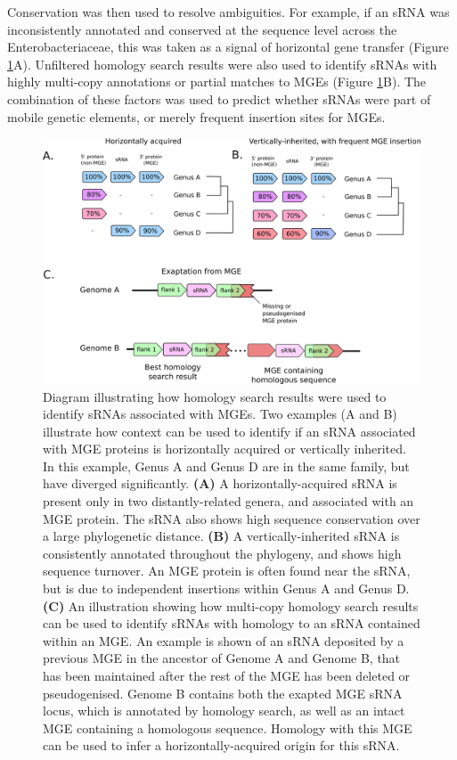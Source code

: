 Conservation was then used to resolve ambiguities. For example, if an sRNA was inconsistently annotated and conserved at the sequence level across the Enterobacteriaceae, this was taken as a signal of horizontal gene transfer (Figure  \ref{fig:hgt_detection}A). Unfiltered homology search results were also used to identify sRNAs with highly multi-copy annotations or partial matches to MGEs (Figure \ref{fig:hgt_detection}B). The combination of these factors was used to predict whether sRNAs were part of mobile genetic elements, or merely frequent insertion sites for MGEs. 
\begin{figure}[H]
    \centering
    \includegraphics[scale=0.9]{sal/hgt_detection.png}
    \caption[Diagram illustrating how homology search results were used to identify sRNAs associated with MGEs]{Diagram illustrating how homology search results were used to identify sRNAs associated with MGEs. Two examples (A and B) illustrate how context can be used to identify if an sRNA associated with MGE proteins is horizontally acquired or vertically inherited. In this example, Genus A and Genus D are in the same family, but have diverged significantly. \textbf{(A)} A horizontally-acquired sRNA is present only in two distantly-related genera, and associated with an MGE protein. The sRNA also shows high sequence conservation over a large phylogenetic distance. \textbf{(B)} A vertically-inherited sRNA is consistently annotated throughout the phylogeny, and shows high sequence turnover. An MGE protein is often found near the sRNA, but is due to independent insertions within Genus A and Genus D. \textbf{(C)} An illustration showing how multi-copy homology search results can be used to identify sRNAs with homology to an sRNA contained within an MGE. An example is shown of an sRNA deposited by a previous MGE in the ancestor of Genome A and Genome B, that has been maintained after the rest of the MGE has been deleted or pseudogenised. Genome B contains both the exapted MGE sRNA locus, which is annotated by homology search, as well as an intact MGE containing a homologous sequence. Homology with this MGE can be used to infer a horizontally-acquired origin for this sRNA.}
    \label{fig:hgt_detection}
\end{figure}
\newpage
